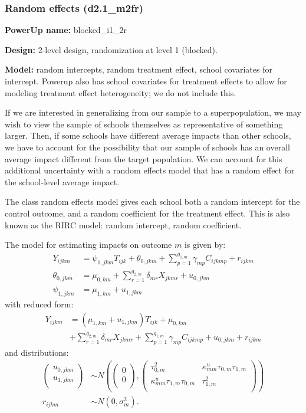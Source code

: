 \documentclass[12pt]{article}
\begin{document}
\subsubsection{Random effects (d2.1\_m2fr)}

\textbf{PowerUp name:} blocked\_i1\_2r

\textbf{Design:} 2-level design, randomization at level 1 (blocked).

\textbf{Model:} random intercepts, random treatment effect, school covariates for intercept. Powerup also has school covariates for treatment effects to allow for modeling treatment effect heterogeneity; we do not include this.

If we are interested in generalizing from our sample to a superpopulation, we may wish to view the sample of schools themselves as representative of something larger.
Then, if some schools have different average impacts than other schools, we have to account for the possibility that our sample of schools has an overall average impact different from the target population.
We can account for this additional uncertainty with a random effects model that has a random effect for the school-level average impact.

The class random effects model gives each school both a random intercept for the control outcome, and  a random coefficient for the treatment effect.
This is also known as the RIRC model: random intercept, random coefficient.

The model for estimating impacts on outcome $m$ is given by:
\begin{align}
Y_{ijkm} &= \psi_{1,jkm} T_{ijk} + \theta_{0,jkm} + \sum_{p=1}^{g_{1,m}} \gamma_{mp} C_{ijkmp} + r_{ijkm}\\
\nonumber \theta_{0,jkm} &= \mu_{0,km} + \sum_{r=1}^{g_{2,m}} \delta_{mr} X_{jkmr} + u_{0,jkm}\\
\nonumber \psi_{1,jkm} &= \mu_{1,km} + u_{1,jkm}
\end{align}
with reduced form:
\begin{align}
Y_{ijkm} &= \left(\mu_{1,km} + u_{1,jkm}\right) T_{ijk} + \mu_{0,km} \\
\nonumber & + \sum_{r=1}^{g_{2,m}} \delta_{mr} X_{jkmr} + \sum_{p=1}^{g_{1,m}} \gamma_{mp} C_{ijkmp} + u_{0,jkm} + r_{ijkm}
\end{align}
and distributions:
\begin{align}
\begin{pmatrix} u_{0, jkm} \\ u_{1,jkm}\\ \end{pmatrix} &\sim
N\left(\begin{pmatrix} 0 \\ 0\\ \end{pmatrix}, \begin{pmatrix} \tau^2_{0,m} & \kappa^u_{mm} \tau_{0,m} \tau_{1,m} \\ \kappa^u_{mm} \tau_{1,m} \tau_{0,m} & \tau^2_{1,m} \\ \end{pmatrix}\right) \\
\nonumber r_{ijkm} &\sim N\left(0, \sigma^2_m\right).
\end{align}
\end{document}

